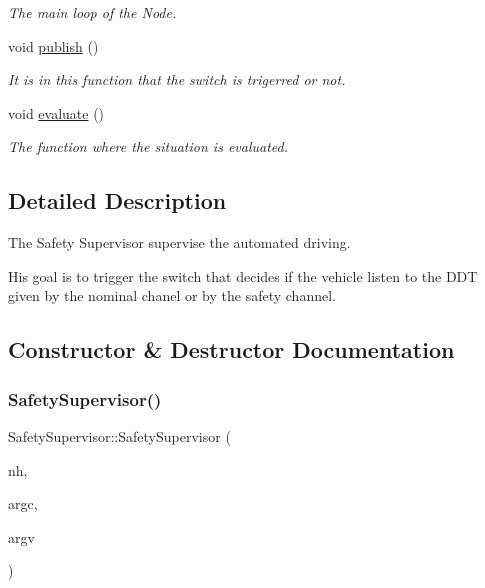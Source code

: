 \begin{DoxyCompactItemize}
$$\begin{DoxyCompactList}\small\item\em The main loop of the Node. \end{DoxyCompactList}\item 
void \hyperlink{classSafetySupervisor_ad4352fec1b8dcbb3b7b89d4caf805542}{publish} ()
\begin{DoxyCompactList}\small\item\em It is in this function that the switch is trigerred or not. \end{DoxyCompactList}\item 
void \hyperlink{classSafetySupervisor_ab44ba3b0008dc564ed49aaeb2258f225}{evaluate} ()
\begin{DoxyCompactList}\small\item\em The function where the situation is evaluated. \end{DoxyCompactList}\end{DoxyCompactItemize}


\subsection{Detailed Description}
The Safety Supervisor supervise the automated driving. 

His goal is to trigger the switch that decides if the vehicle listen to the D\+DT given by the nominal chanel or by the safety channel. 

\subsection{Constructor \& Destructor Documentation}
\mbox{\label{classSafetySupervisor_a4f5bd8fd25814a50b61368a444260471}} 
\subsubsection{\texorpdfstring{Safety\+Supervisor()}{SafetySupervisor()}}
{\footnotesize\ttfamily Safety\+Supervisor\+::\+Safety\+Supervisor (\begin{DoxyParamCaption}\item[{ros\+::\+Node\+Handle \&}]{nh,  }\item[{int}]{argc,  }\item[{char $\ast$$\ast$}]{argv }\end{DoxyParamCaption})\hspace{0.3cm}{\ttfamily [inline]}}



